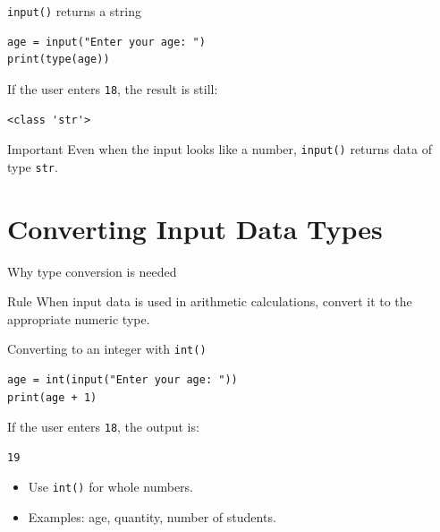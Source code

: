 \documentclass[aspectratio=169,10pt]{beamer}
\begin{document}
\begin{frame}[fragile]{\texttt{input()} returns a string}
\begin{lstlisting}
age = input("Enter your age: ")
print(type(age))
\end{lstlisting}
If the user enters \texttt{18}, the result is still:
\begin{verbatim}
<class 'str'>
\end{verbatim}
\begin{alertblock}{Important}
Even when the input looks like a number, \texttt{input()} returns data of type \texttt{str}.
\end{alertblock}
\end{frame}

\section{Converting Input Data Types}

\begin{frame}{Why type conversion is needed}
\begin{center}
\end{center}
\vspace{0.35cm}
\begin{block}{Rule}
When input data is used in arithmetic calculations, convert it to the appropriate numeric type.
\end{block}
\end{frame}

\begin{frame}[fragile]{Converting to an integer with \texttt{int()}}
\begin{lstlisting}
age = int(input("Enter your age: "))
print(age + 1)
\end{lstlisting}
If the user enters \texttt{18}, the output is:
\begin{verbatim}
19
\end{verbatim}
\begin{itemize}
  \item Use \texttt{int()} for whole numbers.
  \item Examples: age, quantity, number of students.
\end{itemize}
\end{frame}
\end{document}
